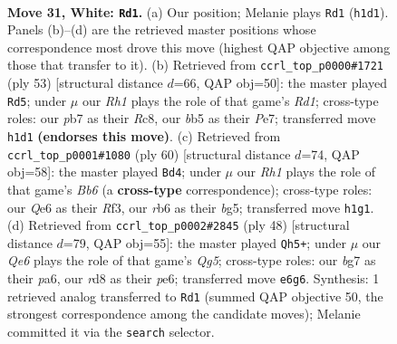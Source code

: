\documentclass[11pt]{article}
\begin{document}
\clearpage

\begin{figure}[p]\centering
\begin{subfigure}{0.46\textwidth}\centering
\resizebox{\linewidth}{!}{%
\newchessgame
\chessboard[
  setfen={3r4/kp2p1bn/1r1pQ3/1b4p1/3PP3/1PR2P2/6PP/1K5R w - - 6 31},
  showmover=false,
  pgfstyle=straightmove, color=movearrow, markmove={h1-d1}
]}
\caption{}
\end{subfigure}\hfill
\begin{subfigure}{0.46\textwidth}\centering
\resizebox{\linewidth}{!}{%
\newchessgame
\chessboard[
  setfen={2rr2k1/p3p2p/4P1p1/1qp5/7P/1Pp1BN2/P1P3P1/1K3R1R b - - 2 27},
  showmover=false,
  pgfstyle=straightmove, color=movearrow, markmove={d8-d5}
]}
\caption{}
\end{subfigure}
\\[4pt]
\begin{subfigure}{0.46\textwidth}\centering
\resizebox{\linewidth}{!}{%
\newchessgame
\chessboard[
  setfen={4r1k1/1p3r1p/pB6/3pP1b1/P4p2/5R1P/1P2R1P1/6K1 w - - 0 31},
  showmover=false,
  pgfstyle=straightmove, color=movearrow, markmove={b6-d4}
]}
\caption{}
\end{subfigure}\hfill
\begin{subfigure}{0.46\textwidth}\centering
\resizebox{\linewidth}{!}{%
\newchessgame
\chessboard[
  setfen={rn5r/5k1p/p3p3/2q2pQ1/1p6/6P1/2P2PRP/3R1K2 w - - 4 25},
  showmover=false,
  pgfstyle=straightmove, color=movearrow, markmove={g5-h5}
]}
\caption{}
\end{subfigure}
\caption{\textbf{Move 31, White: \texttt{Rd1}.} (a) Our position; Melanie plays \texttt{Rd1} (\texttt{h1d1}). Panels (b)--(d) are the retrieved master positions whose correspondence most drove this move (highest QAP objective among those that transfer to it). (b) Retrieved from \texttt{ccrl\_top\_p0000\#1721} (ply 53) [structural distance $d$=66, QAP obj=50]: the master played \texttt{Rd5}; under $\mu$ our \emph{Rh1} plays the role of that game's \emph{Rd1}; cross-type roles: our \emph{p}b7 as their \emph{R}c8, our \emph{b}b5 as their \emph{P}e7; transferred move \texttt{h1d1} \textbf{(endorses this move)}. (c) Retrieved from \texttt{ccrl\_top\_p0001\#1080} (ply 60) [structural distance $d$=74, QAP obj=58]: the master played \texttt{Bd4}; under $\mu$ our \emph{Rh1} plays the role of that game's \emph{Bb6} (a \textbf{cross-type} correspondence); cross-type roles: our \emph{Q}e6 as their \emph{R}f3, our \emph{r}b6 as their \emph{b}g5; transferred move \texttt{h1g1}. (d) Retrieved from \texttt{ccrl\_top\_p0002\#2845} (ply 48) [structural distance $d$=79, QAP obj=55]: the master played \texttt{Qh5+}; under $\mu$ our \emph{Qe6} plays the role of that game's \emph{Qg5}; cross-type roles: our \emph{b}g7 as their \emph{p}a6, our \emph{r}d8 as their \emph{p}e6; transferred move \texttt{e6g6}. Synthesis: 1 retrieved analog transferred to \texttt{Rd1} (summed QAP objective 50, the strongest correspondence among the candidate moves); Melanie committed it via the \texttt{search} selector.}
\label{fig:thought-m60}
\end{figure}
\end{document}
